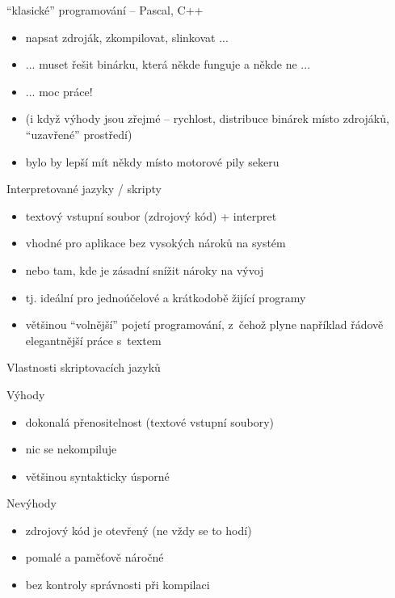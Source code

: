 \documentclass{beamer}
\begin{document}
\begin{frame}{``klasické'' programování -- Pascal, C++}
  \begin{itemize}
    \item napsat zdroják, zkompilovat, slinkovat ...
    \item ... muset řešit binárku, která někde funguje a někde ne ...
    \item ... moc práce!
    \item (i když výhody jsou zřejmé -- rychlost, distribuce binárek místo zdrojáků, ``uzavřené'' prostředí)
    \item bylo by lepší mít někdy místo motorové pily sekeru
  \end{itemize}
\end{frame}

\begin{frame}{Interpretované jazyky / skripty}
  \begin{itemize}
    \item textový vstupní soubor (zdrojový kód) + interpret
    \item vhodné pro aplikace bez vysokých nároků na systém
    \item nebo tam, kde je zásadní snížit nároky na vývoj
    \item tj. ideální pro jednoúčelové a krátkodobě žijící programy
    \item většinou ``volnější'' pojetí programování, z~čehož plyne například řádově elegantnější práce s~textem
  \end{itemize}
\end{frame}

\begin{frame}{Vlastnosti skriptovacích jazyků}
  \begin{block}{Výhody}
    \begin{itemize}
      \item dokonalá přenositelnost (textové vstupní soubory)
      \item nic se nekompiluje
      \item většinou syntakticky úsporné
    \end{itemize}
  \end{block}
  \pause
  \begin{block}{Nevýhody}
    \begin{itemize}
      \item zdrojový kód je otevřený (ne vždy se to hodí)
      \item pomalé a paměťově náročné
      \item bez kontroly správnosti při kompilaci
    \end{itemize}
  \end{block}
\end{frame}
\end{document}
